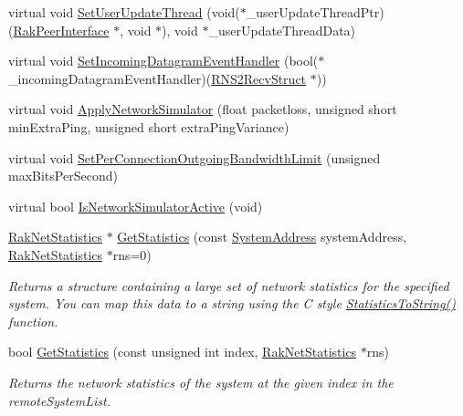 \begin{DoxyCompactItemize}
\item 
virtual void \hyperlink{class_rak_net_1_1_rak_peer_a21f59d33d16332dd8dd96d800c33d06e}{Set\-User\-Update\-Thread} (void($\ast$\-\_\-user\-Update\-Thread\-Ptr)(\hyperlink{class_rak_net_1_1_rak_peer_interface}{Rak\-Peer\-Interface} $\ast$, void $\ast$), void $\ast$\-\_\-user\-Update\-Thread\-Data)
\item 
virtual void \hyperlink{class_rak_net_1_1_rak_peer_a959a1dc3d239d3c5114bc781144d3b73}{Set\-Incoming\-Datagram\-Event\-Handler} (bool($\ast$\-\_\-incoming\-Datagram\-Event\-Handler)(\hyperlink{struct_rak_net_1_1_r_n_s2_recv_struct}{R\-N\-S2\-Recv\-Struct} $\ast$))
\item 
virtual void \hyperlink{class_rak_net_1_1_rak_peer_a38a4348d90eb454b4d470d45fb19b99e}{Apply\-Network\-Simulator} (float packetloss, unsigned short min\-Extra\-Ping, unsigned short extra\-Ping\-Variance)
\item 
virtual void \hyperlink{class_rak_net_1_1_rak_peer_a9c67c61c6eebed7a4ed8bc2ea2813b56}{Set\-Per\-Connection\-Outgoing\-Bandwidth\-Limit} (unsigned max\-Bits\-Per\-Second)
\item 
virtual bool \hyperlink{class_rak_net_1_1_rak_peer_adc9c2b58a0970b6a80e50b1ecf470e43}{Is\-Network\-Simulator\-Active} (void)
\item 
\hyperlink{struct_rak_net_1_1_rak_net_statistics}{Rak\-Net\-Statistics} $\ast$ \hyperlink{class_rak_net_1_1_rak_peer_a0d31a8a91862a6c796730dc3a35f98ee}{Get\-Statistics} (const \hyperlink{struct_rak_net_1_1_system_address}{System\-Address} system\-Address, \hyperlink{struct_rak_net_1_1_rak_net_statistics}{Rak\-Net\-Statistics} $\ast$rns=0)
\begin{DoxyCompactList}\small\item\em Returns a structure containing a large set of network statistics for the specified system. You can map this data to a string using the C style \hyperlink{namespace_rak_net_a49d0ff9db0d324a890e9c08add72a131}{Statistics\-To\-String()} function. \end{DoxyCompactList}\item 
bool \hyperlink{class_rak_net_1_1_rak_peer_a399f918602df7cb051b038e17ad67ecf}{Get\-Statistics} (const unsigned int index, \hyperlink{struct_rak_net_1_1_rak_net_statistics}{Rak\-Net\-Statistics} $\ast$rns)
\begin{DoxyCompactList}\small\item\em Returns the network statistics of the system at the given index in the remote\-System\-List. \end{DoxyCompactList}\item 

\end{DoxyCompactItemize}
